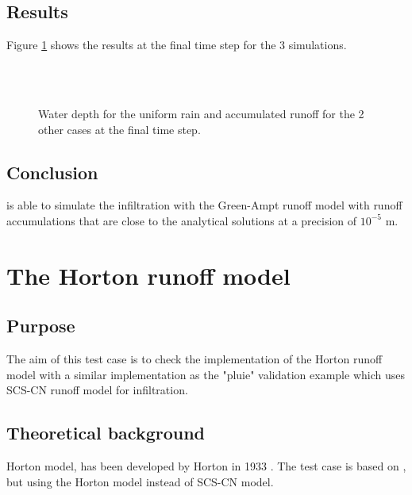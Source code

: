 \subsection{Results}

Figure \ref{pluiehorton:fig:res} shows the results at the final time step for
the 3 simulations.

\begin{figure}[!htbp]
 \centering
 \\
 \\
 \caption{Water depth for the uniform rain and accumulated runoff for the 2 other cases at the final time step.}
 \label{pluiehorton:fig:res}
\end{figure}

\subsection{Conclusion}
 is able to simulate the infiltration with the Green-Ampt runoff
model with runoff accumulations that are close to the analytical solutions at a
precision of $10^{-5}$ m.

\section{The Horton runoff model}
\subsection{Purpose}

The aim of this test case is to check the implementation of the Horton runoff
model with a similar implementation as the "pluie" validation example which uses
SCS-CN runoff model for infiltration.

\subsection{Theoretical background}

Horton model, has been developed by Horton in 1933 \cite{Horton1933}.
The test case is based on \cite{Ligier2016}, but using the Horton model instead
of SCS-CN model.

